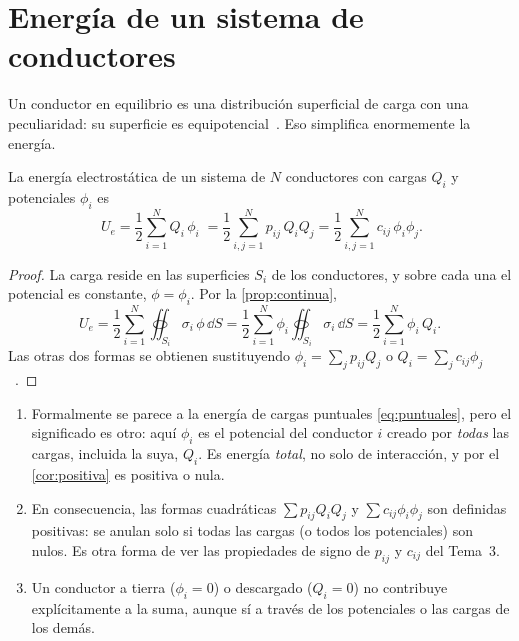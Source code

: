 \section{Energía de un sistema de conductores}\label{sec:conductores}

Un conductor en equilibrio es una distribución superficial de carga con una peculiaridad: su superficie es equipotencial~\cite{T3}. Eso
simplifica enormemente la energía.

\begin{proposicion}\label{prop:conductores}
La energía electrostática de un sistema de $N$ conductores con cargas $Q_i$ y potenciales $\phi_i$ es
\begin{equation}\label{eq:conductores}
  \boxed{\;U_e=\frac12\sum_{i=1}^NQ_i\,\phi_i\;}
  =\frac12\sum_{i,j=1}^Np_{ij}\,Q_iQ_j=\frac12\sum_{i,j=1}^Nc_{ij}\,\phi_i\phi_j .
\end{equation}
\end{proposicion}

\begin{proof}
La carga reside en las superficies $S_i$ de los conductores, y sobre cada una el potencial es constante, $\phi=\phi_i$. Por la
\cref{prop:continua},
\[
  U_e=\frac12\sum_{i=1}^N\oiint_{S_i}\sigma_i\,\phi\,\dd S=\frac12\sum_{i=1}^N\phi_i\oiint_{S_i}\sigma_i\,\dd S=\frac12\sum_{i=1}^N\phi_i\,Q_i .
\]
Las otras dos formas se obtienen sustituyendo $\phi_i=\sum_jp_{ij}Q_j$ o $Q_i=\sum_jc_{ij}\phi_j$~\cite{T3}.
\end{proof}

\begin{observacion}\label{obs:conductores}
\begin{enumerate}
  \item Formalmente se parece a la energía de cargas puntuales \eqref{eq:puntuales}, pero el significado es otro: aquí $\phi_i$ es el
        potencial del conductor $i$ creado por \emph{todas} las cargas, incluida la suya, $Q_i$. Es energía \emph{total}, no solo de
        interacción, y por el \cref{cor:positiva} es positiva o nula.
  \item En consecuencia, las formas cuadráticas $\sum p_{ij}Q_iQ_j$ y $\sum c_{ij}\phi_i\phi_j$ son definidas positivas: se anulan solo si todas las
        cargas (o todos los potenciales) son nulos. Es otra forma de ver las propiedades de signo de $p_{ij}$ y $c_{ij}$ del Tema~3.
  \item Un conductor a tierra ($\phi_i=0$) o descargado ($Q_i=0$) no contribuye explícitamente a la suma, aunque sí a través de los
        potenciales o las cargas de los demás.
\end{enumerate}
\end{observacion}

